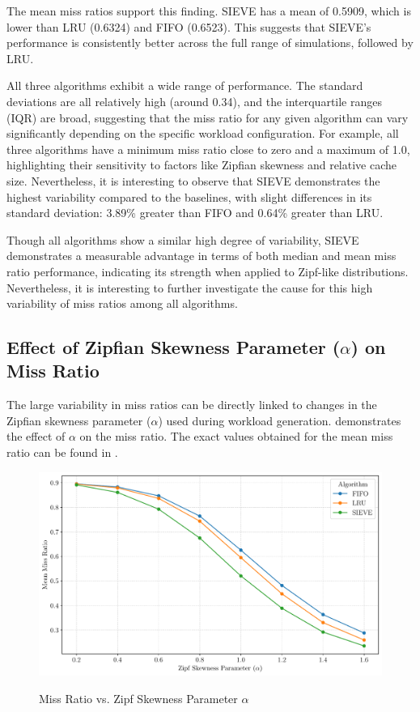 The mean miss ratios support this finding. SIEVE has a mean of 0.5909, which is lower than LRU (0.6324) and FIFO (0.6523). This suggests that SIEVE's performance is consistently better across the full range of simulations, followed by LRU.

All three algorithms exhibit a wide range of performance. The standard deviations are all relatively high (around 0.34), and the interquartile ranges (IQR) are broad, suggesting that the miss ratio for any given algorithm can vary significantly depending on the specific workload configuration. For example, all three algorithms have a minimum miss ratio close to zero and a maximum of 1.0, highlighting their sensitivity to factors like Zipfian skewness and relative cache size. Nevertheless, it is interesting to observe that SIEVE demonstrates the highest variability compared to the baselines, with slight differences in its standard deviation: 3.89\% greater than FIFO and 0.64\% greater than LRU.

Though all algorithms show a similar high degree of variability, SIEVE demonstrates a measurable advantage in terms of both median and mean miss ratio performance, indicating its strength when applied to Zipf-like distributions. Nevertheless, it is interesting to further investigate the cause for this high variability of miss ratios among all algorithms.

\subsection{Effect of Zipfian Skewness Parameter ($\alpha$) on Miss Ratio}\label{results:alpha-miss-ratio}


The large variability in miss ratios can be directly linked to changes in the Zipfian skewness parameter ($\alpha$) used during workload generation.  demonstrates the effect of $\alpha$ on the miss ratio. The exact values obtained for the mean miss ratio can be found in .

\begin{figure}[h!]
    \centering
    \caption{Miss Ratio vs. Zipf Skewness Parameter $\alpha$}
    \includegraphics[width=0.8\linewidth]{figures/simulations/miss_ratio_vs_alpha_no_title.pdf}
    \label{fig:miss-ratio-vs-alpha}
\end{figure}

